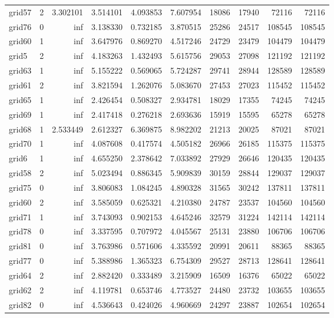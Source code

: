 \begin{longtable}{|l|r|r|r|r|r|r|r|r|r|}
grid57 & 2 & 3.302101 & 3.514101 & 4.093853 & 7.607954 & 18086 & 17940 & 72116 & 72116 \\
grid76 & 0 & inf & 3.138330 & 0.732185 & 3.870515 & 25286 & 24517 & 108545 & 108545 \\
grid60 & 1 & inf & 3.647976 & 0.869270 & 4.517246 & 24729 & 23479 & 104479 & 104479 \\
grid5 & 2 & inf & 4.183263 & 1.432493 & 5.615756 & 29053 & 27098 & 121192 & 121192 \\
grid63 & 1 & inf & 5.155222 & 0.569065 & 5.724287 & 29741 & 28944 & 128589 & 128589 \\
grid61 & 2 & inf & 3.821594 & 1.262076 & 5.083670 & 27453 & 27023 & 115452 & 115452 \\
grid65 & 1 & inf & 2.426454 & 0.508327 & 2.934781 & 18029 & 17355 & 74245 & 74245 \\
grid69 & 1 & inf & 2.417418 & 0.276218 & 2.693636 & 15919 & 15595 & 65278 & 65278 \\
grid68 & 1 & 2.533449 & 2.612327 & 6.369875 & 8.982202 & 21213 & 20025 & 87021 & 87021 \\
grid70 & 1 & inf & 4.087608 & 0.417574 & 4.505182 & 26966 & 26185 & 115375 & 115375 \\
grid6 & 1 & inf & 4.655250 & 2.378642 & 7.033892 & 27929 & 26646 & 120435 & 120435 \\
grid58 & 2 & inf & 5.023494 & 0.886345 & 5.909839 & 30159 & 28844 & 129037 & 129037 \\
grid75 & 0 & inf & 3.806083 & 1.084245 & 4.890328 & 31565 & 30242 & 137811 & 137811 \\
grid60 & 2 & inf & 3.585059 & 0.625321 & 4.210380 & 24787 & 23537 & 104560 & 104560 \\
grid71 & 1 & inf & 3.743093 & 0.902153 & 4.645246 & 32579 & 31224 & 142114 & 142114 \\
grid78 & 0 & inf & 3.337595 & 0.707972 & 4.045567 & 25131 & 23880 & 106706 & 106706 \\
grid81 & 0 & inf & 3.763986 & 0.571606 & 4.335592 & 20991 & 20611 & 88365 & 88365 \\
grid77 & 0 & inf & 5.388986 & 1.365323 & 6.754309 & 29527 & 28713 & 128641 & 128641 \\
grid64 & 2 & inf & 2.882420 & 0.333489 & 3.215909 & 16509 & 16376 & 65022 & 65022 \\
grid62 & 2 & inf & 4.119781 & 0.653746 & 4.773527 & 24480 & 23732 & 103655 & 103655 \\
grid82 & 0 & inf & 4.536643 & 0.424026 & 4.960669 & 24297 & 23887 & 102654 & 102654 \\

\end{longtable}
